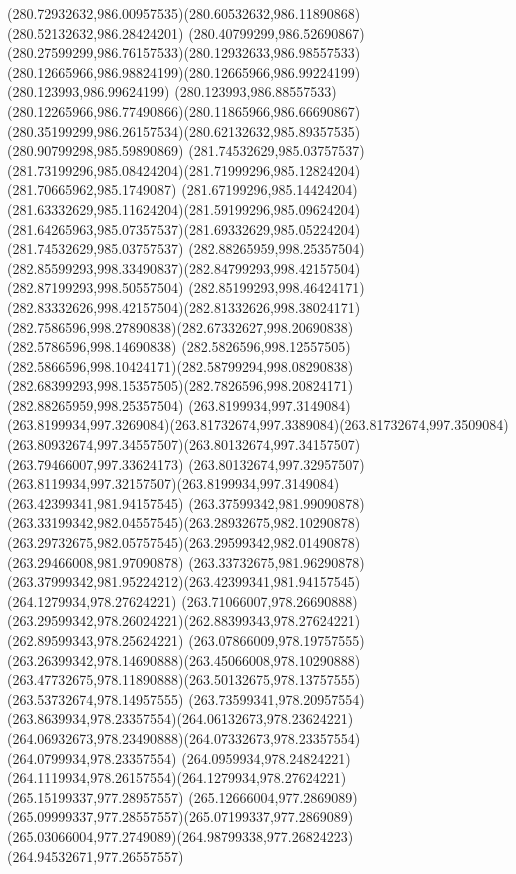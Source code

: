 {{	\curveto(280.72932632,986.00957535)(280.60532632,986.11890868)(280.52132632,986.28424201)
	\curveto(280.40799299,986.52690867)(280.27599299,986.76157533)(280.12932633,986.98557533)
	\curveto(280.12665966,986.98824199)(280.12665966,986.99224199)(280.123993,986.99624199)
	\curveto(280.123993,986.88557533)(280.12265966,986.77490866)(280.11865966,986.66690867)
	\curveto(280.35199299,986.26157534)(280.62132632,985.89357535)(280.90799298,985.59890869)
	\moveto(281.74532629,985.03757537)
	\curveto(281.73199296,985.08424204)(281.71999296,985.12824204)(281.70665962,985.1749087)
	\curveto(281.67199296,985.14424204)(281.63332629,985.11624204)(281.59199296,985.09624204)
	\curveto(281.64265963,985.07357537)(281.69332629,985.05224204)(281.74532629,985.03757537)
	\moveto(282.88265959,998.25357504)
	\curveto(282.85599293,998.33490837)(282.84799293,998.42157504)(282.87199293,998.50557504)
	\curveto(282.85199293,998.46424171)(282.83332626,998.42157504)(282.81332626,998.38024171)
	\curveto(282.7586596,998.27890838)(282.67332627,998.20690838)(282.5786596,998.14690838)
	\curveto(282.5826596,998.12557505)(282.5866596,998.10424171)(282.58799294,998.08290838)
	\curveto(282.68399293,998.15357505)(282.7826596,998.20824171)(282.88265959,998.25357504)
	\moveto(263.8199934,997.3149084)
	\curveto(263.8199934,997.3269084)(263.81732674,997.3389084)(263.81732674,997.3509084)
	\curveto(263.80932674,997.34557507)(263.80132674,997.34157507)(263.79466007,997.33624173)
	\curveto(263.80132674,997.32957507)(263.8119934,997.32157507)(263.8199934,997.3149084)
	\moveto(263.42399341,981.94157545)
	\curveto(263.37599342,981.99090878)(263.33199342,982.04557545)(263.28932675,982.10290878)
	\curveto(263.29732675,982.05757545)(263.29599342,982.01490878)(263.29466008,981.97090878)
	\curveto(263.33732675,981.96290878)(263.37999342,981.95224212)(263.42399341,981.94157545)
	\moveto(264.1279934,978.27624221)
	\curveto(263.71066007,978.26690888)(263.29599342,978.26024221)(262.88399343,978.27624221)
	\lineto(262.89599343,978.25624221)
	\curveto(263.07866009,978.19757555)(263.26399342,978.14690888)(263.45066008,978.10290888)
	\curveto(263.47732675,978.11890888)(263.50132675,978.13757555)(263.53732674,978.14957555)
	\curveto(263.73599341,978.20957554)(263.8639934,978.23357554)(264.06132673,978.23624221)
	\curveto(264.06932673,978.23490888)(264.07332673,978.23357554)(264.0799934,978.23357554)
	\curveto(264.0959934,978.24824221)(264.1119934,978.26157554)(264.1279934,978.27624221)
	\moveto(265.15199337,977.28957557)
	\curveto(265.12666004,977.2869089)(265.09999337,977.28557557)(265.07199337,977.2869089)
	\curveto(265.03066004,977.2749089)(264.98799338,977.26824223)(264.94532671,977.26557557)
}}
